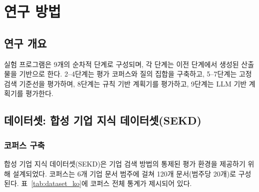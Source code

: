 \chapter{연구 방법}
\label{chap:methodology_ko}

\section{연구 개요}
\label{sec:method_overview_ko}

실험 프로그램은 9개의 순차적 단계로 구성되며, 각 단계는 이전 단계에서 생성된 산출물을 기반으로 한다. 2--4단계는 평가 코퍼스와 질의 집합을 구축하고, 5--7단계는 고정 검색 기준선을 평가하며, 8단계는 규칙 기반 계획기를 평가하고, 9단계는 LLM 기반 계획기를 평가한다.

\section{데이터셋: 합성 기업 지식 데이터셋(SEKD)}
\label{sec:method_dataset_ko}

\subsection{코퍼스 구축}

합성 기업 지식 데이터셋(SEKD)은 기업 검색 방법의 통제된 평가 환경을 제공하기 위해 설계되었다. 코퍼스는 6개 기업 문서 범주에 걸쳐 120개 문서(범주당 20개)로 구성된다. 표~\ref{tab:dataset_ko}에 코퍼스 전체 통계가 제시되어 있다.

